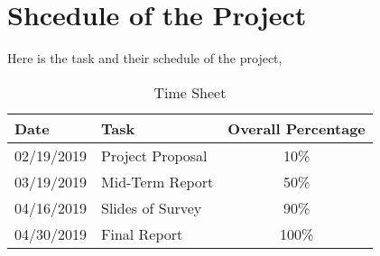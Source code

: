 \documentclass[a4paper,10pt]{article}
\begin{document}
\section{Shcedule of the Project}
Here is the task and their schedule of the project,
\begin{table}[htb]
  \small
\caption{Time Sheet}
\label{tab:timesheet}
\centering
\begin{tabular}[c]{| l | l | c|}
\hline
Date & Task & Overall Percentage \\ \hline
02/19/2019 & Project Proposal & 10\% \\ \hline
03/19/2019 & Mid-Term Report & 50\% \\ \hline
04/16/2019 & Slides of Survey & 90\% \\ \hline
04/30/2019 & Final Report & 100\% \\ \hline
\end{tabular}
\end{table}



\end{document}
